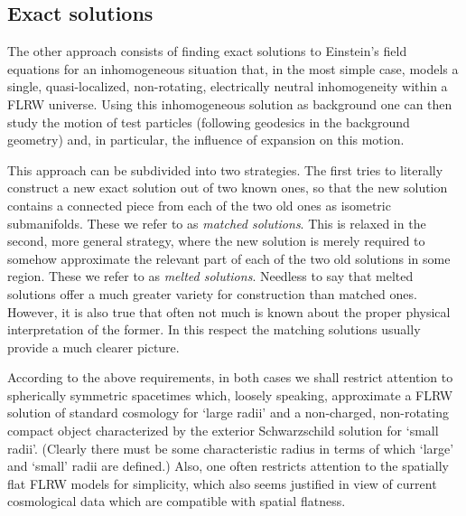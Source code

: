 \documentclass
[rmp,aps,twocolumn,showpacs,preprintnumbers,amsmath,amssymb]{revtex4}
\theoremstyle{plain}
\theoremstyle{definition}
\theoremstyle{remark}
\begin{document}
\subsection{Exact solutions}
\label{sec:ExactSolutions}
%
The other approach consists of finding exact solutions to Einstein's field 
equations for an inhomogeneous situation that, in the most simple case, 
models a single, quasi-localized, non-rotating, electrically neutral 
inhomogeneity within a FLRW universe. Using this inhomogeneous solution as 
background one can then study the motion of test particles (following 
geodesics in the background geometry) and, in particular, the influence of 
expansion on this motion. 

This approach can be subdivided into two strategies. The first tries 
to literally construct a new exact solution out of two known ones, so 
that the new solution contains a connected piece from each of the two 
old ones as isometric submanifolds. These we refer to as 
\emph{matched solutions}. This is relaxed in the second, more 
general strategy, where the new solution is merely required to 
somehow approximate the relevant part of each of the two old 
solutions in some region. These we refer to as \emph{melted solutions}.
Needless to say that melted solutions offer a much greater 
variety for construction than matched ones. However, it is 
also true that often not much is known about the proper physical 
interpretation of the former. In this respect the matching 
solutions usually provide a much clearer picture. 

According to the above requirements, in both cases we shall restrict 
attention to spherically symmetric spacetimes which, loosely 
speaking, approximate a FLRW solution of standard cosmology for 
`large radii' and a non-charged, non-rotating compact object 
characterized by the exterior Schwarzschild solution for `small radii'. 
(Clearly there must be some characteristic radius in terms of which 
`large' and `small' radii are defined.) 
Also, one often restricts attention to the spatially flat 
FLRW models for simplicity, which also seems justified in view 
of current cosmological data which are compatible with spatial 
flatness.
\end{document}
